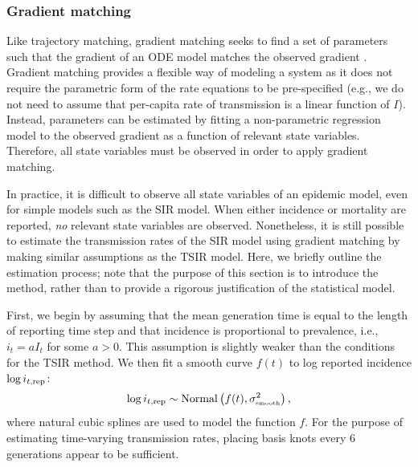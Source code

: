 \documentclass{article}
\newcommand{\tsub}[2]{#1_{{\textrm{\tiny #2}}}}
\begin{document}
\subsubsection*{Gradient matching}

Like trajectory matching, gradient matching seeks to find a set of parameters such that the gradient of an ODE model matches the observed gradient \citep{ellner2002fitting}.
Gradient matching provides a flexible way of modeling a system as it does not require the parametric form of the rate equations to be pre-specified (e.g., we do not need to assume that per-capita rate of transmission is a linear function of $I$).
Instead, parameters can be estimated by fitting a non-parametric regression model to the observed gradient as a function of relevant state variables.
Therefore, all state variables must be observed in order to apply gradient matching.

In practice, it is difficult to observe all state variables of an epidemic model, even for simple models such as the SIR model.
When either incidence or mortality are reported, \emph{no} relevant state variables are observed.
Nonetheless, it is still possible to estimate the transmission rates of the SIR model using gradient matching by making similar assumptions as the TSIR model.
Here, we briefly outline the estimation process;
note that the purpose of this section is to introduce the method, rather than to provide a rigorous justification of the statistical model.

First, we begin by assuming that the mean generation time is equal to the length of reporting time step and that incidence is proportional to prevalence, i.e., $i_t = a I_t$ for some $a > 0$. 
This assumption is slightly weaker than the conditions for the TSIR method.
We then fit a smooth curve $f(t)$ to log reported incidence $\log i_{t, {\tiny \textrm{rep}}}$:
\begin{equation}
\log i_{t, {\tiny \textrm{rep}}} \sim \mathrm{Normal}\left(f(t), \tsub{\sigma}{smooth}^2 \right),
\end{equation}
where natural cubic splines are used to model the function $f$.
For the purpose of estimating time-varying transmission rates, placing basis knots every 6 generations appear to be sufficient.
\end{document}
